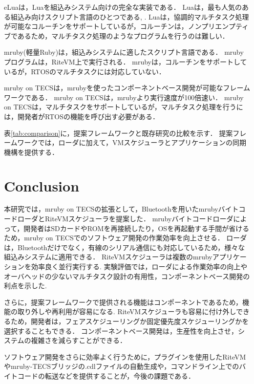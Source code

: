 \documentclass[submit]{ipsj_v2/UTF8/ipsj}
\begin{document}
eLuaは，Luaを組込みシステム向けの完全な実装である．
Luaは，最も人気のある組込み向けスクリプト言語のひとつである\cite{url:Lua}, \cite{par:Lua}.
Luaは，協調的マルチタスク処理が可能なコルーチンをサポートしているが，コルーチンは，ノンプリエンプティブであるため，マルチタスク処理のようなプログラムを行うのは難しい．

mruby(軽量Ruby)は，組込みシステムに適したスクリプト言語である．
mrubyプログラムは，RiteVM上で実行される．
mrubyは，コルーチンをサポートしているが，RTOSのマルチタスクには対応していない．

mruby on TECSは，mrubyを使ったコンポーネントベース開発が可能なフレームワークである．
mruby on TECSは，mrubyより実行速度が100倍速い．
mruby on TECSは，マルチタスクをサポートしているが，マルチタスク処理を行うには，開発者がRTOSの機能を呼び出す必要がある．

表\ref{tab:comparison}に，提案フレームワークと既存研究の比較を示す．
提案フレームワークでは，ローダに加えて，VMスケジューラとアプリケーションの同期機構を提供する．

\section{Conclusion}
\label{sec:Conclusion}
本研究では，mruby on TECSの拡張として，Bluetoothを用いたmrubyバイトコードローダとRiteVMスケジューラを提案した．
mrubyバイトコードローダによって，開発者はSDカードやROMを再接続したり，OSを再起動する手間が省けるため，mruby on TECSでのソフトウェア開発の作業効率を向上させる．
ローダは，Bluetoothだけでなく，有線のシリアル通信にも対応しているため，様々な組込みシステムに適用できる．
RiteVMスケジューラは複数のmrubyアプリケーションを効率良く並行実行する.
実験評価では，ローダによる作業効率の向上やオーバヘッドの少ないマルチタスク設計の有用性，コンポーネントベース開発の利点を示した.

さらに，提案フレームワークで提供される機能はコンポーネントであるため，機能の取り外しや再利用が容易になる.
RiteVMスケジューラも容易に付け外しできるため，開発者は，フェアスケジューリングか固定優先度スケジューリングかを選択することもできる．
コンポーネントベース開発は，生産性を向上させ，システムの複雑さを減らすことができる．

ソフトウェア開発をさらに効率よく行うために，プラグインを使用したRiteVMやmruby-TECSブリッジの.cdlファイルの自動生成や，コマンドライン上でのバイトコードの転送などを提供することが，今後の課題である．



\end{document}
